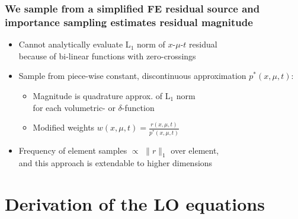 \documentclass[xcolor=dvipsnames,hyperref={pdfpagelabels=false},unknownkeysallowed]{beamer}
\newcommand{\colG}[1]{{\color{Gray!110} #1}}
\newlength{\wideitemsep}
\let\olditem\item
\renewcommand{\item}{\setlength{\itemsep}{\wideitemsep}\olditem}
\begin{document}
\begin{frame}
    \frametitle{We sample from a simplified FE residual source and\\ importance
    sampling estimates residual magnitude}
    \addtolength{\wideitemsep}{0.15in}
    \begin{itemize}
        \item[] Cannot analytically evaluate L$_1$ norm of $x$-$\mu$-$t$ residual
            \\ \colG{because of bi-linear functions with zero-crossings}
        \item[] Sample from piece-wise constant, discontinuous approximation  $p^*(x,\mu,t)$:
           \begin{itemize}
            \item Magnitude is quadrature approx. of L$_1$ norm \\ \colG{for each volumetric- or $\delta$-function}
            \item Modified weights $w(x,\mu,t) = \frac{r(x,\mu,t)}{p^*(x,\mu,t)}$
            \end{itemize}
           \item[] Frequency of element samples $\propto$ $\|r\|_1$ over element,\\
               \colG{and this approach is extendable to higher dimensions}
    \end{itemize}
\end{frame}



\section{Derivation of the LO equations}
\subsection{}
\end{document}
